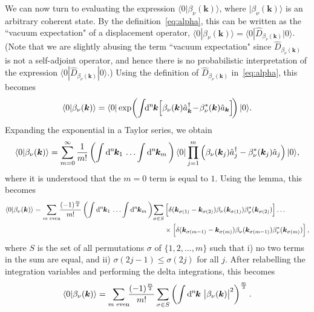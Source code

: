 \documentclass[pra,nofootinbib,floats,aps,twocolumn,tightenlines,superscriptaddress]{revtex4-1}
\renewcommand*\d[2][]{%
	\mathrm{d}%
	\ifx\relax#1\relax\else
	\rule{-0.02em}{1.5ex}^{#1}\rule{0.08em}{0ex}\!
	\fi
	#2\,
}
\newcommand{\ket}[1]{| {#1} \rangle}
\newcommand{\bra}[1]{\langle {#1} |}
\renewcommand{\a}[1]{\hat{a}_{\bm{#1}}}
\newcommand{\ad}[1]{\hat{a}_{\bm{#1}}^\dagger}
\newcommand{\an}[1]{\hat{a}_{#1}}
\newcommand{\adn}[1]{\hat{a}_{#1}^\dagger}
\newcommand{\bnu}{\beta_\nu(\bm k)}
\begin{document}
We can now turn to evaluating the expression $\bra{0}\bnu\rangle$, where $\ket{\bnu}$ is an arbitrary coherent state. By the definition~\eqref{eq:alpha}, this can be written as the ``vacuum expectation" of a displacement operator, $\bra{0}\bnu\rangle= \bra{0}\hat{D}_{\bnu} \ket{0}$. (Note that we are slightly abusing the term ``vacuum expectation" since $\hat{D}_{\bnu}$ is not a self-adjoint operator, and hence there is no probabilistic interpretation of the expression $\bra{0}\hat{D}_{\bnu}\ket{0}$.) Using the definition of $\hat{D}_{\bnu}$ in~\eqref{eq:alpha}, this becomes
\begin{equation}
    \bra{0}\bnu\rangle
    =
    \bra{0}
    \exp\!
	\left(\int\!\!\d[n]{\bm{k}}\!\!\left[\bnu\ad{k}
	\!-\!
	\beta_\nu^*(\bm k)\a{k}\right]\!\right)
	\ket{0}.
\end{equation}
Expanding the exponential in a Taylor series, we obtain
\begin{equation}
    \bra{0}\bnu\rangle
    =
    \sum_{m=0}^\infty
    \frac{1}{m!}
    \left(
    \int\d[n]{\bm{k}_1}
    \ldots
    \int\d[n]{\bm{k}_m}
    \right)
    \bra{0}
    \prod_{j=1}^m
    \left(\beta_\nu(\bm{k}_j)\adn{j}
    -\beta_\nu^*(\bm{k}_j)\an{j}\right)
    \ket{0},
\end{equation}
where it is understood that the $m=0$ term is equal to $1$. Using the lemma, this becomes
\begin{align}
    \bra{0}\bnu\rangle
    =
    \sum_{m \text{ even}}\!\!
    \frac{(-1)^\frac{m}{2}}{m!}
    \left(
    \int\d[n]{\bm{k}_1}
    \ldots
    \int\d[n]{\bm{k}_m}
    \right)
    \!\sum_{\sigma\in S}
    &
    \left[\delta(\bm{k}_{\sigma(1)}-
    \bm{k}_{\sigma(2)})
    \beta_\nu(\bm{k}_{\sigma(1)})
    \beta_\nu^*(\bm{k}_{\sigma(2)})
    \right]
    \ldots
    \notag\\
    &\times
    \left[\delta(\bm{k}_{\sigma(m-1)}-
    \bm{k}_{\sigma(m)})
    \beta_\nu(\bm{k}_{\sigma(m-1)})
    \beta_\nu^*(\bm{k}_{\sigma(m)})
    \right],
\end{align}
where $S$ is the set of all permutations $\sigma$ of $\{1,2,\ldots,m\}$ such that i) no two terms in the sum are equal, and ii) $\sigma(2j-1)\le\sigma(2j)$ for all $j$. After relabelling the integration variables and performing the delta integrations, this becomes
\begin{equation}
    \bra{0}\bnu\rangle
    =
    \sum_{m \text{ even}}\!\!
    \frac{(-1)^\frac{m}{2}}{m!}
    \sum_{\sigma\in S}
    \left(
    \int\d[n]{\bm k}
    \left|
    \bnu
    \right|^2
    \right)^\frac{m}{2}.
\end{equation}
\end{document}
